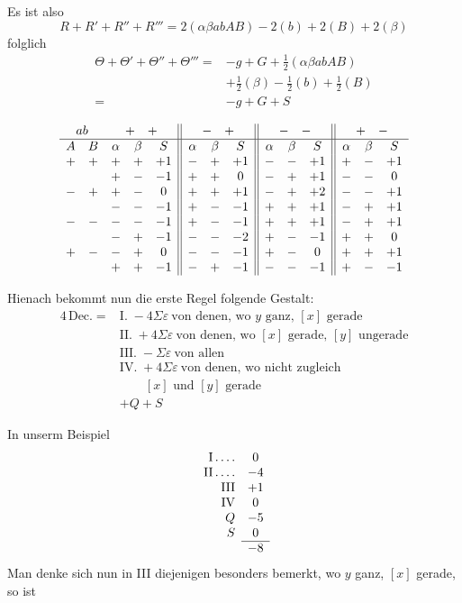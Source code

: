 %
Es ist also
\[
R+R'+R''+R'''=2(\alpha\beta abAB)-2(b)+2(B)+2(\beta)
\]
folglich
\[
\begin{aligned}
\Theta+\Theta'+\Theta''+\Theta'''={}&-g+G+\tfrac12(\alpha\beta abAB)\\
&+\tfrac12(\beta)-\tfrac12(b)+\tfrac12(B)\\
={}&-g+G+S
\end{aligned}
\]

\begingroup\small\setlength{\arraycolsep}{2.6pt}
\[
\begin{array}{ccccc||ccc||ccc||ccc}
\multicolumn{2}{c}{ab}&\multicolumn{3}{c||}{+\quad+}&\multicolumn{3}{c||}{-\quad+}&\multicolumn{3}{c||}{-\quad-}&\multicolumn{3}{c}{+\quad-}\\\hline
A&B&\alpha&\beta&S&\alpha&\beta&S&\alpha&\beta&S&\alpha&\beta&S\\
+&+&+&+&+1&-&+&+1&-&-&+1&+&-&+1\\
&&+&-&-1&+&+&0&-&+&+1&-&-&0\\
-&+&+&-&0&+&+&+1&-&+&+2&-&-&+1\\
&&-&-&-1&+&-&-1&+&+&+1&-&+&+1\\
-&-&-&-&-1&+&-&-1&+&+&+1&-&+&+1\\
&&-&+&-1&-&-&-2&+&-&-1&+&+&0\\
+&-&-&+&0&-&-&-1&+&-&0&+&+&+1\\
&&+&+&-1&-&+&-1&-&-&-1&+&-&-1\\
\end{array}
\]
\endgroup

Hienach bekommt nun die erste Regel folgende Gestalt:
\[
\begin{aligned}
4\,\text{Dec.}={}&\text{I.}\;-4\Sigma\varepsilon\ \text{von denen, wo }y\text{ ganz, }[x]\text{ gerade}\\
&\text{II.}\;+4\Sigma\varepsilon\ \text{von denen, wo }[x]\text{ gerade, }[y]\text{ ungerade}\\
&\text{III.}\;-\Sigma\varepsilon\ \text{von allen}\\
&\text{IV.}\;+4\Sigma\varepsilon\ \text{von denen, wo nicht zugleich}\\
&\qquad [x]\text{ und }[y]\text{ gerade}\\
&+Q+S
\end{aligned}
\]

In unserm Beispiel
\[
\begin{array}{rc}
\mathrm{I}\dotsfour&0\\
\mathrm{II}\dotsfour&-4\\
\mathrm{III}&+1\\
\mathrm{IV}&0\\
Q&-5\\
S&0\\\cline{2-2}
&-8
\end{array}
\]
Man denke sich nun in III diejenigen besonders bemerkt, wo $y$ ganz, $[x]$ gerade, so ist


